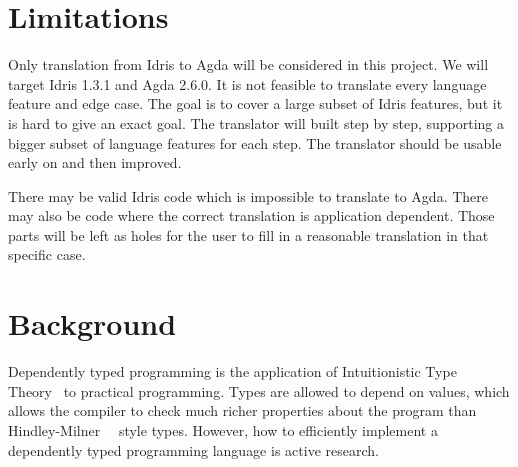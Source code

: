\documentclass[parskip=half]{scrartcl}
\begin{document}
\section{Limitations}
Only translation from Idris to Agda will be considered in this project. We will
target Idris 1.3.1 and Agda 2.6.0. It is not feasible to translate every
language feature and edge case.  The goal is to cover a large subset of Idris
features, but it is hard to give an exact goal.  The translator will built step
by step, supporting a bigger subset of language features for each step. The
translator should be usable early on and then improved.

There may be valid Idris code which is impossible to translate to Agda. There
may also be code where the correct translation is application dependent. Those
parts will be left as holes for the user to fill in a reasonable translation in
that specific case.





\section{Background}

Dependently typed programming is the application of
Intuitionistic Type Theory~\cite{martinlof} to practical programming.
Types are allowed to depend on values, which allows the compiler to check much
richer properties about the program than Hindley-Milner~\cite{hindley}~\cite{milner}
style types. However, how to efficiently implement a dependently typed
programming language is active research.
\end{document}
